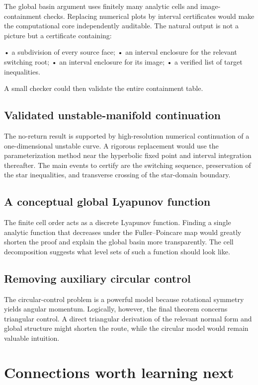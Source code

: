 The global basin argument uses finitely many analytic cells and image-containment checks. Replacing numerical plots by interval certificates would make the computational core independently auditable. The natural output is not a picture but a certificate containing:


• a subdivision of every source face; • an interval enclosure for the relevant switching root; • an interval enclosure for its image; • a verified list of target inequalities.


A small checker could then validate the entire containment table.


\subsection{Validated unstable-manifold continuation}

The no-return result is supported by high-resolution numerical continuation of a one-dimensional unstable curve. A rigorous replacement would use the parameterization method near the hyperbolic fixed point and interval integration thereafter. The main events to certify are the switching sequence, preservation of the star inequalities, and transverse crossing of the star-domain boundary.


\subsection{A conceptual global Lyapunov function}

The finite cell order acts as a discrete Lyapunov function. Finding a single analytic function that decreases under the Fuller–Poincare map would greatly shorten the proof and explain the global basin more transparently. The cell decomposition suggests what level sets of such a function should look like.


\subsection{Removing auxiliary circular control}

The circular-control problem is a powerful model because rotational symmetry yields angular momentum. Logically, however, the final theorem concerns triangular control. A direct triangular derivation of the relevant normal form and global structure might shorten the route, while the circular model would remain valuable intuition.


\section{Connections worth learning next}

